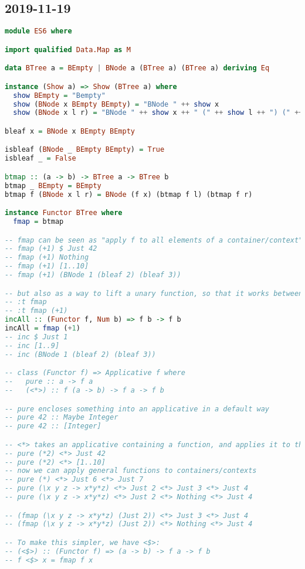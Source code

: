 \subsection{2019-11-19}
\begin{lstlisting}[language=Haskell]
module ES6 where

import qualified Data.Map as M

data BTree a = BEmpty | BNode a (BTree a) (BTree a) deriving Eq

instance (Show a) => Show (BTree a) where
  show BEmpty = "Bempty"
  show (BNode x BEmpty BEmpty) = "BNode " ++ show x
  show (BNode x l r) = "BNode " ++ show x ++ " (" ++ show l ++ ") (" ++ show r ++ ")"

bleaf x = BNode x BEmpty BEmpty

isbleaf (BNode _ BEmpty BEmpty) = True
isbleaf _ = False

btmap :: (a -> b) -> BTree a -> BTree b
btmap _ BEmpty = BEmpty
btmap f (BNode x l r) = BNode (f x) (btmap f l) (btmap f r)

instance Functor BTree where
  fmap = btmap

-- fmap can be seen as "apply f to all elements of a container/context"
-- fmap (+1) $ Just 42
-- fmap (+1) Nothing
-- fmap (+1) [1..10]
-- fmap (+1) (BNode 1 (bleaf 2) (bleaf 3))

-- but also as a way to lift a unary function, so that it works between functors
-- :t fmap
-- :t fmap (+1)
incAll :: (Functor f, Num b) => f b -> f b
incAll = fmap (+1)
-- inc $ Just 1
-- inc [1..9]
-- inc (BNode 1 (bleaf 2) (bleaf 3))

-- class (Functor f) => Applicative f where
--   pure :: a -> f a
--   (<*>) :: f (a -> b) -> f a -> f b

-- pure encloses something into an applicative in a default way
-- pure 42 :: Maybe Integer
-- pure 42 :: [Integer]

-- <*> takes an applicative containing a function, and applies it to the content of another applicative
-- pure (*2) <*> Just 42
-- pure (*2) <*> [1..10]
-- now we can apply general functions to containers/contexts
-- pure (*) <*> Just 6 <*> Just 7
-- pure (\x y z -> x*y*z) <*> Just 2 <*> Just 3 <*> Just 4
-- pure (\x y z -> x*y*z) <*> Just 2 <*> Nothing <*> Just 4

-- (fmap (\x y z -> x*y*z) (Just 2)) <*> Just 3 <*> Just 4
-- (fmap (\x y z -> x*y*z) (Just 2)) <*> Nothing <*> Just 4

-- To make this simpler, we have <$>:
-- (<$>) :: (Functor f) => (a -> b) -> f a -> f b
-- f <$> x = fmap f x


\end{lstlisting}
